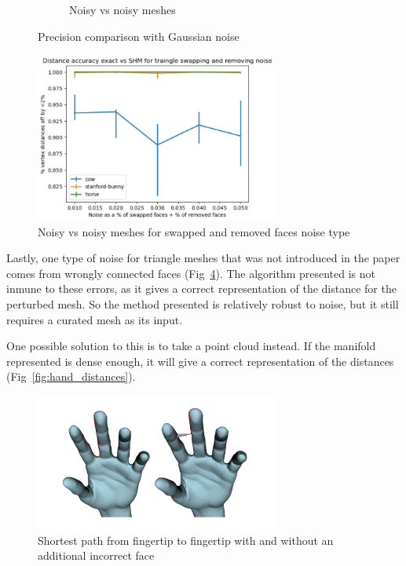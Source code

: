 \documentclass[sigconf, nonacm]{acmart}
\begin{document}
\begin{figure}[htbp]
\begin{subfigure}[b]{0.23\textwidth}
    \caption{Noisy vs noisy meshes}
    \label{fig:noisy_vs_noisy}
  \end{subfigure}
  \caption{Precision comparison with Gaussian noise}
  \label{fig:original_vs_noisy_gaussian}
  \Description{}
\end{figure}

\begin{figure}
  \centering
  \includegraphics[width=8cm]{original_vs_original_swapped_and_removed_triangles.png}
  \caption{Noisy vs noisy meshes for swapped and removed faces noise type}
  \label{fig:noisy_vs_noisy_swapped_and_removed}
\end{figure}

Lastly, one type of noise for triangle meshes that was not introduced in the paper comes from
wrongly connected faces (Fig~\ref{fig:hands}). The algorithm presented is not inmune to these errors,
as it gives a correct representation of the distance for the perturbed mesh. So the method
presented is relatively robust to noise, but it still requires a curated mesh as its input. 

One possible solution to this is to take a point cloud instead. If the manifold represented is
dense enough, it will give a correct representation of the distances (Fig~\ref{fig:hand_distances}).

\begin{figure}
  \centering
  \includegraphics[width=8cm]{hands.png}
  \caption{Shortest path from fingertip to fingertip with and without an additional incorrect face}
  \label{fig:hands}
\end{figure}
\end{document}

